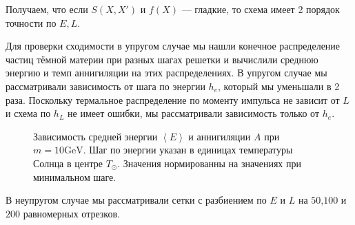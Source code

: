 \documentclass[a4paper, 14pt]{article}
\newcommand{\avarage}[1]{\left\langle #1 \right\rangle}
\begin{document}
Получаем, что если $S(X,X')$ и $f(X)$ --- гладкие, то схема имеет 2 порядок точности по $E,L$.



Для проверки сходимости в упругом случае мы нашли конечное распределение частиц тёмной материи при разных шагах решетки и вычислили среднюю энергию и темп аннигиляции на этих распределениях. В упругом случае мы рассматривали зависимость от шага по энергии $h_e$, который мы уменьшали в 2 раза. Поскольку термальное распределение по моменту импульса не зависит от $L$ и схема по $h_L$ не имеет ошибки, мы рассматривали зависимость только от $h_e$. 



\begin{figure}[!h]
	\centering
	\caption{Зависимость средней энергии $\avarage{E}$ и аннигиляции $A$ при $m = 10 \text{GeV}$. Шаг по энергии указан в единицах температуры Солнца в центре $T_{\odot}$. Значения нормированны на значениях при минимальном шаге.}
	\label{plot:ConvEl10}
\end{figure}

В неупругом случае мы рассматривали сетки с разбиением по $E$ и $L$ на $50$,$100$ и $200$ равномерных отрезков.
\end{document}
